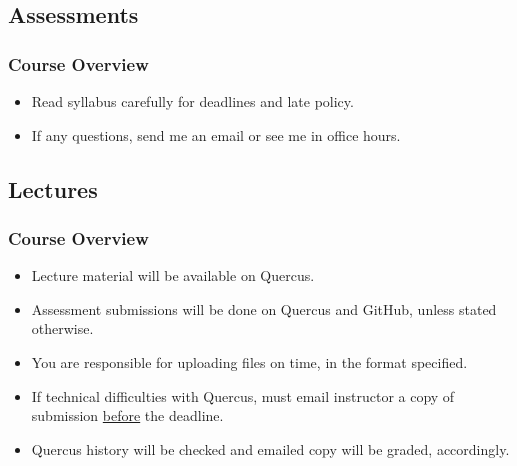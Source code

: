 \documentclass[11pt]{beamer}
\begin{document}
\subsection{Assessments}
\begin{frame}
\frametitle{Course Overview}
\begin{itemize}
\item Read syllabus carefully for deadlines and late policy. 
\vspace{0.1in}
\item If any questions, send me an email or see me in office hours. 
\end{itemize}
\end{frame}

\subsection{Lectures}
\begin{frame}
\frametitle{Course Overview}
\begin{itemize}
\item Lecture material will be available on Quercus.
\vspace{0.1in}
\item Assessment submissions will be done on Quercus and GitHub, unless stated otherwise.
\vspace{0.1in}
\item You are responsible for uploading files on time, in the format specified. 
\vspace{0.1in}
\item If technical difficulties with Quercus, must email instructor a copy of submission \underline{before} the deadline.
\vspace{0.1in}
\item Quercus history will be checked and emailed copy will be graded, accordingly. 
\end{itemize}
\end{frame}

\end{document}
